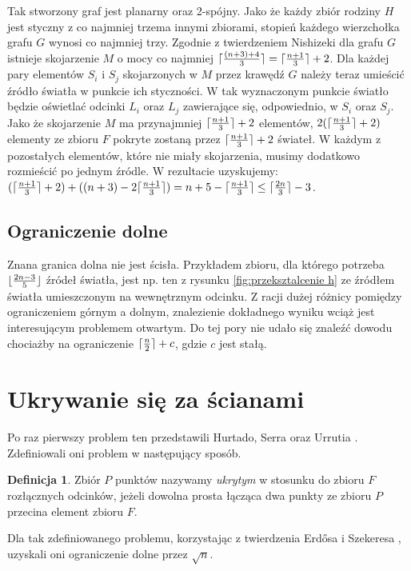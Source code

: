 \documentclass[brudnopis]{xmgr}
\DeclarePairedDelimiter\ceil{\lceil}{\rceil}
\DeclarePairedDelimiter\floor{\lfloor}{\rfloor}
\theoremstyle{definition}
\newtheorem{Definicja}{Definicja}
\begin{document}
Tak stworzony graf jest planarny oraz 2-spójny. Jako że każdy zbiór rodziny $H$ jest styczny z co najmniej trzema innymi zbiorami, stopień każdego wierzchołka grafu $G$ wynosi co najmniej trzy. Zgodnie z twierdzeniem Nishizeki \cite{nishizeki} dla grafu $G$ istnieje skojarzenie $M$ o mocy co najmniej $\ceil{\frac{(n+3)+4}{3}} = \ceil{\frac{n+1}{3}}  + 2$. Dla każdej pary elementów $S_i$ i $S_j$ skojarzonych w $M$ przez krawędź $G$ należy teraz umieścić źródło światła w punkcie ich styczności. W tak wyznaczonym punkcie światło będzie oświetlać odcinki $L_i$ oraz $L_j$ zawierające się, odpowiednio, w $S_i$ oraz $S_j$. Jako że skojarzenie $M$ ma przynajmniej $\ceil{\frac{n+1}{3}} + 2$ elementów, $2(\ceil{\frac{n+1}{3}} + 2)$ elementy ze zbioru $F$ pokryte zostaną przez $\ceil{\frac{n+1}{3}} + 2$ świateł. W każdym z pozostałych elementów, które nie miały skojarzenia, musimy dodatkowo rozmieścić po jednym źródle. W rezultacie uzyskujemy:
$(\ceil{\frac{n+1}{3}} + 2) + ((n + 3) - 2\ceil{\frac{n+1}{3}}) = n + 5 - \ceil{\frac{n+1}{3}} \le \ceil{\frac{2n}{3}} - 3$.

\subsection{Ograniczenie dolne}
\indent Znana granica dolna nie jest ścisła. Przykładem zbioru, dla którego potrzeba $\floor{\frac{2n-3}{5}}$ źródeł światła, jest np. ten z rysunku \ref{fig:przeksztalcenie h} ze źródłem światła umieszczonym na wewnętrznym odcinku. Z racji dużej różnicy pomiędzy ograniczeniem górnym a dolnym, znalezienie dokładnego wyniku wciąż jest interesującym problemem otwartym. Do tej pory nie udało się znaleźć dowodu chociażby na ograniczenie $\ceil{\frac{n}{2}} + c$, gdzie $c$ jest stałą.

\section{Ukrywanie się za ścianami}
Po raz pierwszy problem ten przedstawili Hurtado, Serra oraz Urrutia \cite{sciany}. Zdefiniowali oni problem w następujący sposób.

\begin{Definicja}\label{ukrywanie definicja}
 Zbiór $P$ punktów nazywamy \emph{ukrytym} w stosunku do zbioru $F$ rozłącznych odcinków, jeżeli dowolna prosta łącząca dwa punkty ze zbioru $P$ przecina element zbioru $F$.
\end{Definicja}

Dla tak zdefiniowanego problemu, korzystając z twierdzenia Erd{\H o}sa i Szekeresa \cite{erdosszekeres}, uzyskali oni ograniczenie dolne przez $\sqrt{n}$.
\end{document}
